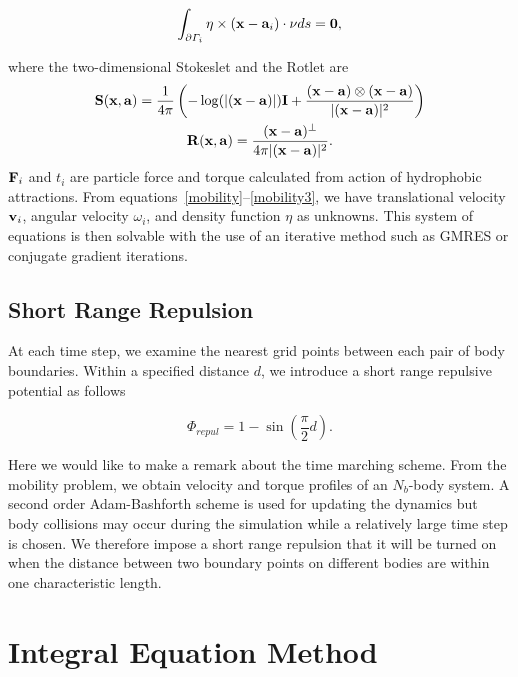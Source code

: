 \documentclass[lineno]{jfm}
\begin{document}
%
\begin{center}
\begin{equation}
\label{mobility3}
\int_{\partial \Gamma_i}\eta\times({\bf x}-{\bf a}_i)\cdot \nu ds ={\bf 0},
\end{equation}
\end{center}
%
where the two-dimensional Stokeslet and the Rotlet are
%
\begin{gather}
{\bf S}({\bf x}, {\bf a}) = \frac{1}{4\pi}\left(-\log(|({\bf x}-{\bf a})|){\bf I}+\frac{({\bf x}-{\bf a})\otimes({\bf x}-{\bf a})}{|({\bf x}-{\bf a})|^2}\right) \\ 
{\bf R}({\bf x},{\bf a})=\frac{({\bf x}-{\bf a})^\perp}{4\pi|({\bf x}-{\bf a})|^2}.
\end{gather}
%
${\bf F}_i$ and $t_i$ are particle force and torque calculated from action of hydrophobic attractions. From equations~\eqref{mobility}--\eqref{mobility3}, we have translational velocity ${\bf v}_i$, angular velocity $\omega_i$, and density function $\eta$ as unknowns.
This system of equations is then solvable with the use of an iterative method such as GMRES or conjugate gradient iterations.

\subsection{Short Range Repulsion}

At each time step, we examine the nearest grid points between each pair of body  boundaries. Within a specified distance $d$, we introduce a short range repulsive potential as follows

\begin{equation}
\Phi_{repul} = 1- \sin\left(\frac{\pi}{2} d\right).
\end{equation}

Here we would like to make a remark about the time marching scheme. From the mobility problem, we obtain velocity and torque profiles of an $N_b$-body system. A second order Adam-Bashforth scheme is used for updating the dynamics but body collisions may occur during the simulation while a relatively large time step is chosen. We therefore impose a short range repulsion that it will be turned on when the distance between two boundary points on different bodies are within one characteristic length.




\section{\label{IEM}Integral Equation Method}
\end{document}
